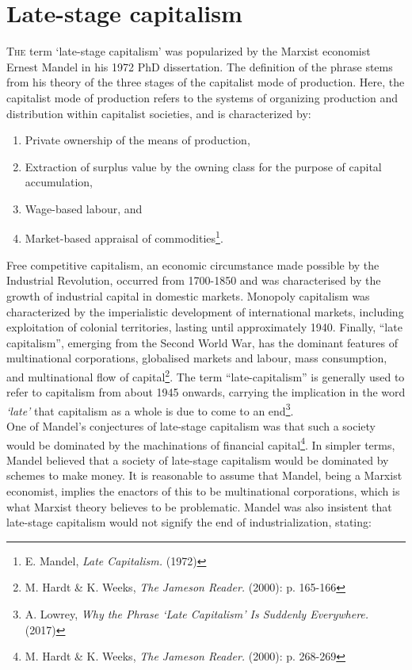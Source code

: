 \documentclass[11pt]{article}
\newcommand\addtotocsection[1]{\addcontentsline{toc}{section}{#1}}
\newcommand\mandelref{E. Mandel, \textit{Late Capitalism.} (1972)}
\newcommand\hardtref{M. Hardt \& K. Weeks, \textit{The Jameson Reader.} (2000)}
\newcommand\lowreyref{A. Lowrey, \textit{Why the Phrase `Late Capitalism' Is Suddenly Everywhere.} (2017)}
\begin{document}
	\section*{Late-stage capitalism}\addtotocsection{Late-stage capitalism}
	\textsc{The} term `late-stage capitalism' was popularized by the Marxist economist Ernest Mandel in his 1972 PhD dissertation. The definition of the phrase stems from his theory of the three stages of the capitalist mode of production. Here, the capitalist mode of production refers to the systems of organizing production and distribution within capitalist societies, and is characterized by:
	\begin{enumerate}
		\item Private ownership of the means of production,
		\item Extraction of surplus value by the owning class for the purpose of capital accumulation,
		\item Wage-based labour, and
		\item Market-based appraisal of commodities\footnote{\mandelref}.
	\end{enumerate}
	Free competitive capitalism, an economic circumstance made possible by the Industrial Revolution, occurred from 1700-1850 and was characterised by the growth of industrial capital in domestic markets. Monopoly capitalism was characterized by the imperialistic development of international markets, including exploitation of colonial territories, lasting until approximately 1940. Finally, ``late capitalism'', emerging from the Second World War, has the dominant features of multinational corporations, globalised markets and labour, mass consumption, and multinational flow of capital\footnote{\hardtref: p. 165-166}. The term ``late-capitalism'' is generally used to refer to capitalism from about 1945 onwards, carrying the implication in the word \textit{`late'} that capitalism as a whole is due to come to an end\footnote{\lowreyref}.\\
	\smallbreak\noindent
	One of Mandel's conjectures of late-stage capitalism was that such a society would be dominated by the machinations of financial capital\footnote{\hardtref: p. 268-269}. In simpler terms, Mandel believed that a society of late-stage capitalism would be dominated by schemes to make money. It is reasonable to assume that Mandel, being a Marxist economist, implies the enactors of this to be multinational corporations, which is what Marxist theory believes to be problematic. Mandel was also insistent that late-stage capitalism would not signify the end of industrialization, stating:
\end{document}

